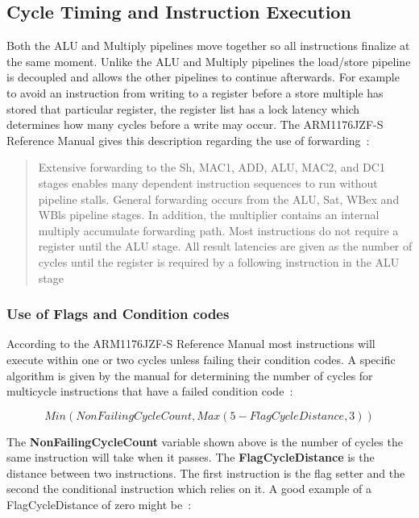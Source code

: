 \documentclass[11pt]{report}
\begin{document}
\subsection{Cycle Timing and Instruction Execution}
\begin{onehalfspace}
Both the ALU and Multiply pipelines move together so all instructions finalize at the same moment. Unlike the ALU and Multiply pipelines the load/store pipeline is decoupled and allows the other pipelines to continue afterwards. For example to avoid an instruction from writing to a register before a store multiple has stored that particular register, the register list has a lock latency which determines how many cycles before a write may occur. The ARM1176JZF-S Reference Manual gives this description regarding the use of forwarding~\citep[16-21]{arm1176jzf-s}:
\end{onehalfspace}
\begin{quote}
Extensive forwarding to the Sh, MAC1, ADD, ALU, MAC2, and DC1 stages enables many
dependent instruction sequences to run without pipeline stalls. General forwarding occurs from
the ALU, Sat, WBex and WBls pipeline stages. In addition, the multiplier contains an internal
multiply accumulate forwarding path. Most instructions do not require a register until the ALU
stage. All result latencies are given as the number of cycles until the register is required by a
following instruction in the ALU stage
\end{quote}
\begin{onehalfspace}
\subsubsection{Use of Flags and Condition codes}
According to the ARM1176JZF-S Reference Manual most instructions will execute within one or two cycles unless failing their condition codes. A specific algorithm is given by the manual for determining the number of cycles for multicycle instructions that have a failed condition code~\citep[16-4]{arm1176jzf-s}:
\end{onehalfspace}
\[
Min(NonFailingCycleCount, Max(5 - FlagCycleDistance, 3))
\]
\begin{onehalfspace}
The \textbf{NonFailingCycleCount} variable shown above is the number of cycles the same instruction will take when it passes. The \textbf{FlagCycleDistance} is the distance between two instructions. The first instruction is the flag setter and the second the conditional instruction which relies on it. A good example of a FlagCycleDistance of zero might be~\citep[16-4]{arm1176jzf-s}: 
\end{onehalfspace}
\end{document}
